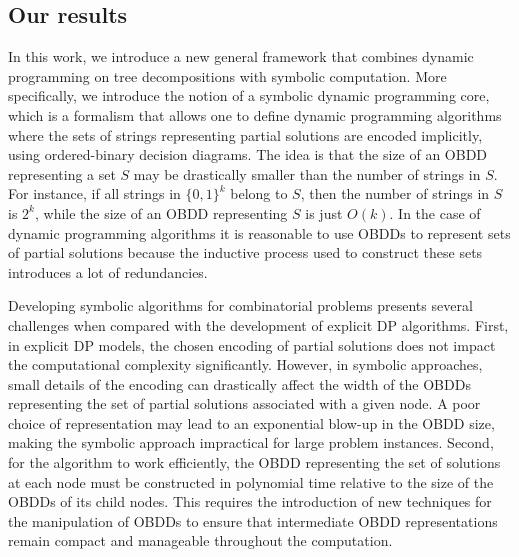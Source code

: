 \subsection{Our results}

In this work, we introduce a new general framework that combines dynamic programming on tree decompositions with symbolic computation. More specifically, we introduce the notion of a symbolic dynamic programming core, which is a formalism that allows one to define dynamic programming algorithms where the sets of strings representing partial solutions are encoded implicitly, using ordered-binary decision diagrams. The idea is that the size of an OBDD representing a set $S$ may be drastically smaller than the number of strings in $S$. For instance, if all strings in $\{0,1\}^k$ belong to $S$, then the number of strings in $S$ is $2^{k}$, while the size of an OBDD representing $S$ is just $O(k)$. In the case of dynamic programming algorithms it is reasonable to use OBDDs to represent sets of partial solutions because the inductive process used to construct these sets introduces a lot of redundancies. 

Developing symbolic algorithms for combinatorial problems presents several challenges when compared with the development of explicit DP algorithms. First, in explicit DP models, the chosen encoding of partial solutions does not impact the computational complexity significantly. However, in symbolic approaches, small details of the encoding can drastically affect the width of the OBDDs representing the set of partial solutions associated with a given node. A poor choice of representation may lead to an exponential blow-up in the OBDD size, making the symbolic approach impractical for large problem instances. Second, for the algorithm to work efficiently, the OBDD representing the set of solutions at each node must be constructed in polynomial time relative to the size of the OBDDs of its child nodes. This requires the introduction of new techniques for the manipulation of OBDDs to ensure that intermediate OBDD representations remain compact and manageable throughout the computation.

